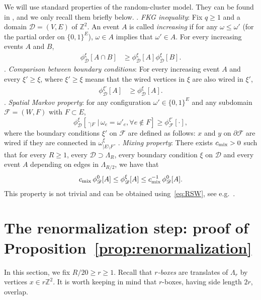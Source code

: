 \documentclass[a4paper,oneside,11pt]{article}
\numberwithin{equation}{section}
\numberwithin{equation}{section}
\numberwithin{equation}{section}
\newcommand{\calD}{\mathcal{D}}
\newcommand{\calF}{\mathcal{F}}
\newcommand{\bbZ}{\mathbb{Z}}
\begin{document}
We will use standard properties of the random-cluster model. They can be found in \cite{Gri06}, and we only recall them briefly below. 
\medbreak{}. {\em FKG inequality}: Fix $q\ge 1$ and a domain $\mathcal D=(V,E)$ of $\bbZ^2$. 
An event $A$ is called {\em increasing} if for any $\omega\le\omega'$ (for the partial order on $\{0,1\}^E$), $\omega\in A$  implies that $\omega'\in A$.
For every  increasing events $A$ and $B$,
\begin{align}\label{eq:FKG} 
	\phi_{\calD}^\xi[A\cap B]&\ge \phi_{\calD}^\xi[A]\phi_{\calD}^{\xi}[B].\end{align}
\medbreak{}. {\em Comparison between boundary conditions}: For every increasing event $A$ and every $\xi'\ge\xi$, where $\xi'\ge\xi$ means that the wired vertices in $\xi$ are also wired in $\xi'$,
	\begin{align} 	\label{eq:CBC} 
	\phi_{\calD}^{\xi'}[A]&\ge \phi_{\calD}^\xi[A].
\end{align}
\medbreak{}. {\em Spatial Markov property}: for any configuration $\omega'\in\{0,1\}^E$ and any subdomain $\mathcal F=(W,F)$ with  $F\subset E$,
\begin{equation}\label{eq:SMP} 	\phi_{\calD}^\xi[\cdot_{|F}\,|\,\omega_e=\omega'_e,\forall e\notin F]\ge \phi_{\calF}^{\xi'}[\cdot],
\end{equation} where the boundary conditions $\xi'$ on $\calF$ are  defined as follows: 
$x$ and $y$ on $\partial \calF$ are wired if they are connected in $\omega_{|E\setminus F}^\xi$. 
\medbreak{}. {\em Mixing property}:
    There exists $c_{\rm mix}>0$ such that for every $R\ge1$, every $\calD\supset\Lambda_{R}$, every boundary condition $\xi$ on $\calD$ 
    and every event $A$ depending on edges in $\Lambda_{R/2}$, we have that
    \begin{align}\label{eq:mix2}
    	c_{\rm mix}\,\phi_{\calD}^0[A]\le \phi_{\calD}^\xi [A]
    	\le c_{\rm mix}^{-1}\,\phi_{\calD}^0 [A].
    \end{align}
This property is not trivial and can be obtained using~\eqref{eq:RSW}, see e.g.~\cite{Dum13}.



\section{The renormalization step: proof of Proposition~\ref{prop:renormalization}}\label{sec:2}

In this section, we fix $R/20 \ge r\ge1$. Recall that {\em $r$-boxes} are translates of $\Lambda_r$ by vertices $x\in r\mathbb Z^2$. It is worth keeping in mind that $r$-boxes, having side length $2r$, overlap.
\end{document}
